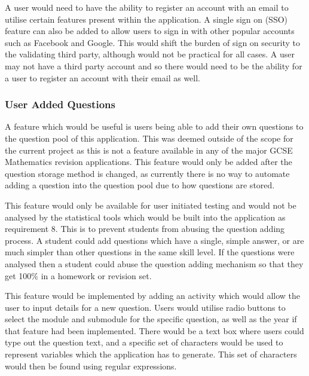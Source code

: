 \documentclass{article}
\begin{document}
A user would need to have the ability to register an account with an email to utilise certain features present within the application. A single sign on (SSO) feature can also be added to allow users to sign in with other popular accounts such as Facebook and Google. This would shift the burden of sign on security to the validating third party, although would not be practical for all cases. A user may not have a third party account and so there would need to be the ability for a user to register an account with their email as well. \par

\subsubsection{User Added Questions}

A feature which would be useful is users being able to add their own questions to the question pool of this application. This was deemed outside of the scope for the current project as this is not a feature available in any of the major GCSE Mathematics revision applications. This feature would only be added after the question storage method is changed, as currently there is no way to automate adding a question into the question pool due to how questions are stored. \par

This feature would only be available for user initiated testing and would not be analysed by the statistical tools which would be built into the application as requirement 8. This is to prevent students from abusing the question adding process. A student could add questions which have a single, simple answer, or are much simpler than other questions in the same skill level. If the questions were analysed then a student could abuse the question adding mechanism so that they get 100\% in a homework or revision set. \par

This feature would be implemented by adding an activity which would allow the user to input details for a new question. Users would utilise radio buttons to select the module and submodule for the specific question, as well as the year if that feature had been implemented. There would be a text box where users could type out the question text, and a specific set of characters would be used to represent variables which the application has to generate. This set of characters would then be found using regular expressions. \par
\end{document}
